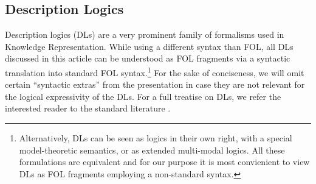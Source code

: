 \subsection{Description Logics}\label{app:DLintro}
\newcommand{\Preds}{\Sigma}
\newcommand{\Consts}{\mathbf{C}}
\newcommand{\ebnfeq}{::=}
\newcommand{\conc}[1]{#1}
\newcommand{\rol}[1]{#1}
\newcommand{\ind}[1]{\mathtt{#1}}
\newcommand{\inda}{\ind{a}}
\newcommand{\indb}{\ind{b}}
\newcommand{\indc}{\ind{c}}
\newcommand{\indd}{\ind{d}}
\newcommand{\rolexpR}{\rol{R}}
\newcommand{\rolexpS}{\rol{S}}
\newcommand{\rolR}{\rol{R}}
\newcommand{\rolnR}{\mathtt{R}}
\newcommand{\rolS}{\rol{S}}
\newcommand{\rolnS}{\mathtt{S}}
\newcommand{\rolT}{\mathtt{t}}
\newcommand{\rolU}{\mathtt{U}}
\newcommand{\rolV}{\rol{V}}
\newcommand{\rolW}{\rol{W}}
\newcommand{\conA}{\mathtt{A}}
\newcommand{\connA}{\mathtt{A}}
\newcommand{\conB}{\mathtt{B}}
\newcommand{\conC}{\conc{C}}
\newcommand{\conD}{\conc{D}}
\newcommand{\conE}{\conc{E}}
\newcommand{\conF}{\conc{F}}
\newcommand{\conS}{\mathtt{M}}
\newcommand{\atleast}[1]{\mathord{\geqslant}#1\,}
\newcommand{\atmost}[1]{\mathord{\leqslant}#1\,}
\newcommand{\Self}{\text{\sf{Self}}}
\newcommand{\ssb}{\sqsubseteq}
\newcommand{\SROIQ}{\mbox{$\mathcal{SROIQ}b_s$}}
\newcommand{\define}[1]{\emph{#1}}
\newcommand{\connames}{\Preds_1}
\newcommand{\rolnames}{\Preds_2}
\newcommand{\indnames}{\mathbf{C}}
\newcommand{\Inv}{\fcn{inv}}
\newcommand{\Dis}{\mathrm{Dis}}
\newcommand{\itemb}{\item}
\newcommand{\Vars}{\mathbf{V}}
\newcommand{\llang}[1]{\mathscr{#1}}

Description logics (DLs) are a very prominent family of formalisms used in Knowledge Representation. While using a different syntax than FOL, all DLs discussed in this article can be understood as FOL fragments via a syntactic translation into standard FOL syntax.\footnote{Alternatively, DLs can be seen as logics in their own right, with a special model-theoretic semantics, or as extended multi-modal logics. All these formulations are equivalent and for our purpose it is most convienient to view DLs as FOL fragments employing a non-standard syntax.} For the sake of conciseness, we will omit certain ``syntactic extras'' from the presentation in case they are not relevant for the logical expressivity of the DLs. For a full treatise on DLs, we refer the interested reader to the standard literature \cite{baader_horrocks_lutz_sattler_2017,Rudolph11}.

